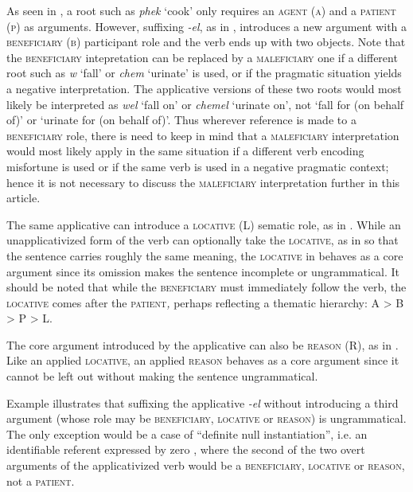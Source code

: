 \documentclass[output=paper]{langsci/langscibook}
\begin{document}
As seen in , a root such as \textit{phek} ‘cook’ only requires an \textsc{agent} (\textsc{a}) and a \textsc{patient} (\textsc{p}) as arguments. However, suffixing \textit{-el}, as in , introduces a new argument with a \textsc{beneficiary} (\textsc{b}) participant role and the verb ends up with two objects. Note that the \textsc{beneficiary} intepretation can be replaced by a \textsc{maleficiary} one if a different root such as \textit{w} ‘fall’ or \textit{chem} ‘urinate’ is used, or if the pragmatic situation yields a negative interpretation. The applicative versions of these two roots would most likely be interpreted as \textit{wel} ‘fall on’ or \textit{chemel} ‘urinate on’, not ‘fall for (on behalf of)’ or ‘urinate for (on behalf of)’. Thus wherever reference is made to a \textsc{beneficiary} role, there is need to keep in mind that a \textsc{maleficiary} interpretation would most likely apply in the same situation if a different verb encoding misfortune is used or if the same verb is used in a negative pragmatic context; hence it is not necessary to discuss the \textsc{maleficiary} interpretation further in this article. 

 The same applicative can introduce a \textsc{locative} (L) sematic role, as in . While an unapplicativized form of the verb can optionally take the \textsc{locative}, as in  so that the sentence carries roughly the same meaning, the \textsc{locative} in  behaves as a core argument since its omission makes the sentence incomplete or ungrammatical. It should be noted that while the \textsc{beneficiary} must immediately follow the verb, the \textsc{locative} comes after the \textsc{patient}\textit{,} perhaps reflecting a thematic hierarchy: A > B > P > L. 

 The core argument introduced by the applicative can also be \textsc{reason} (R), as in . Like an applied \textsc{locative}, an applied \textsc{reason} behaves as a core argument since it cannot be left out without making the sentence ungrammatical. 

 Example  illustrates that suffixing the applicative \textit{-el} without introducing a third argument (whose role may be \textsc{beneficiary}, \textsc{locative} or \textsc{reason}) is ungrammatical. The only exception would be a case of “definite null instantiation”, i.e. an identifiable referent expressed by zero \citep{Fillmore1986,FillmoreKay1999}, where the second of the two overt arguments of the applicativized verb would be a \textsc{beneficiary}, \textsc{locative} or \textsc{reason}, not a \textsc{patient}.
\end{document}
